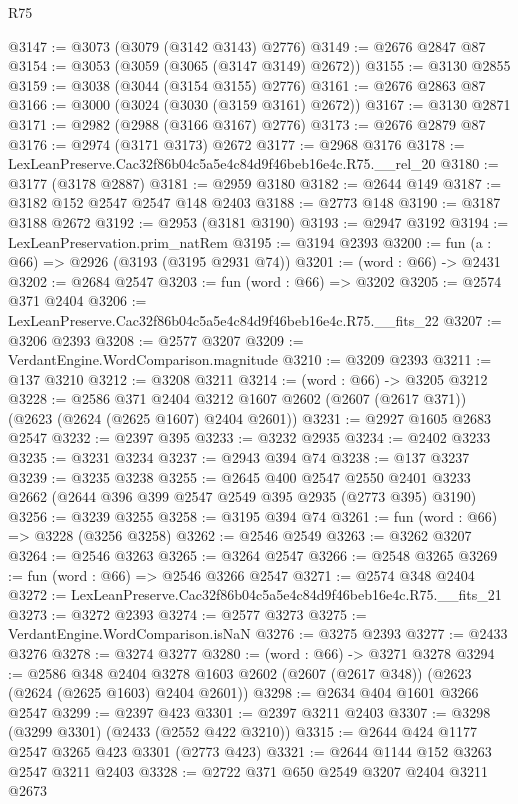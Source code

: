 \begin{lexlean}{R75}
\begin{coremodule}
@3147 := @3073 (@3079 (@3142 @3143) @2776)
@3149 := @2676 @2847 @87
@3154 := @3053 (@3059 (@3065 (@3147 @3149) @2672))
@3155 := @3130 @2855
@3159 := @3038 (@3044 (@3154 @3155) @2776)
@3161 := @2676 @2863 @87
@3166 := @3000 (@3024 (@3030 (@3159 @3161) @2672))
@3167 := @3130 @2871
@3171 := @2982 (@2988 (@3166 @3167) @2776)
@3173 := @2676 @2879 @87
@3176 := @2974 (@3171 @3173) @2672
@3177 := @2968 @3176
@3178 := LexLeanPreserve.Cac32f86b04c5a5e4c84d9f46beb16e4c.R75.__rel_20
@3180 := @3177 (@3178 @2887)
@3181 := @2959 @3180
@3182 := @2644 @149
@3187 := @3182 @152 @2547 @2547 @148 @2403
@3188 := @2773 @148
@3190 := @3187 @3188 @2672
@3192 := @2953 (@3181 @3190)
@3193 := @2947 @3192
@3194 := LexLeanPreservation.prim_natRem
@3195 := @3194 @2393
@3200 := fun (a : @66) => @2926 (@3193 (@3195 @2931 @74))
@3201 := (word : @66) -> @2431
@3202 := @2684 @2547
@3203 := fun (word : @66) => @3202
@3205 := @2574 @371 @2404
@3206 := LexLeanPreserve.Cac32f86b04c5a5e4c84d9f46beb16e4c.R75.__fits_22
@3207 := @3206 @2393
@3208 := @2577 @3207
@3209 := VerdantEngine.WordComparison.magnitude
@3210 := @3209 @2393
@3211 := @137 @3210
@3212 := @3208 @3211
@3214 := (word : @66) -> @3205 @3212
@3228 := @2586
    @371
    @2404
    @3212
    @1607
    @2602
    (@2607 (@2617 @371))
    (@2623 (@2624 (@2625 @1607) @2404 @2601))
@3231 := @2927 @1605 @2683 @2547
@3232 := @2397 @395
@3233 := @3232 @2935
@3234 := @2402 @3233
@3235 := @3231 @3234
@3237 := @2943 @394 @74
@3238 := @137 @3237
@3239 := @3235 @3238
@3255 := @2645
    @400
    @2547
    @2550
    @2401
    @3233
    @2662
    (@2644 @396 @399 @2547 @2549 @395 @2935 (@2773 @395) @3190)
@3256 := @3239 @3255
@3258 := @3195 @394 @74
@3261 := fun (word : @66) => @3228 (@3256 @3258)
@3262 := @2546 @2549
@3263 := @3262 @3207
@3264 := @2546 @3263
@3265 := @3264 @2547
@3266 := @2548 @3265
@3269 := fun (word : @66) => @2546 @3266 @2547
@3271 := @2574 @348 @2404
@3272 := LexLeanPreserve.Cac32f86b04c5a5e4c84d9f46beb16e4c.R75.__fits_21
@3273 := @3272 @2393
@3274 := @2577 @3273
@3275 := VerdantEngine.WordComparison.isNaN
@3276 := @3275 @2393
@3277 := @2433 @3276
@3278 := @3274 @3277
@3280 := (word : @66) -> @3271 @3278
@3294 := @2586
    @348
    @2404
    @3278
    @1603
    @2602
    (@2607 (@2617 @348))
    (@2623 (@2624 (@2625 @1603) @2404 @2601))
@3298 := @2634 @404 @1601 @3266 @2547
@3299 := @2397 @423
@3301 := @2397 @3211 @2403
@3307 := @3298 (@3299 @3301) (@2433 (@2552 @422 @3210))
@3315 := @2644 @424 @1177 @2547 @3265 @423 @3301 (@2773 @423)
@3321 := @2644 @1144 @152 @3263 @2547 @3211 @2403
@3328 := @2722 @371 @650 @2549 @3207 @2404 @3211 @2673

\end{coremodule}
\end{lexlean}
